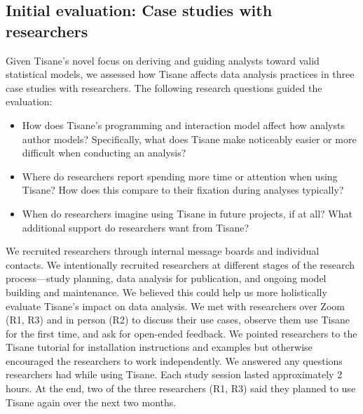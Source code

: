 \subsection{Initial evaluation: Case studies with researchers}\label{sec:tisane_case_studies}
Given Tisane's novel focus on deriving and
guiding analysts toward valid statistical models, we assessed how Tisane affects
data analysis practices in three case studies with researchers. The following research questions guided
the evaluation:
\begin{itemize}
    \item \rqWorkflow How does Tisane's programming and interaction model
    affect how analysts author models? Specifically, what does Tisane make
    noticeably easier or more difficult when conducting an analysis?
    \item \rqCognitive Where do researchers report spending more
    time or attention when using Tisane? How does this compare to their
    fixation during analyses typically?
    \item \rqFuture When do researchers imagine using Tisane
    in future projects, if at all? What additional support do researchers want
    from Tisane? 
\end{itemize}

We recruited researchers through internal message boards and individual
contacts. We intentionally recruited researchers at different stages of the
research process---study planning, data analysis for publication, and ongoing
model building and maintenance. We believed this could help us more holistically
evaluate Tisane's impact on data analysis. We met with researchers over Zoom
(R1, R3) and in person (R2) to discuss their use cases, observe them use
Tisane for the first time, and ask for open-ended feedback. We pointed researchers to the Tisane tutorial for
installation instructions and examples but otherwise encouraged the researchers
to work independently. We answered any questions researchers had while using Tisane.
Each study session lasted approximately 2 hours. At the end, two of the three
researchers (R1, R3) said they planned to use Tisane again over the next two months.

